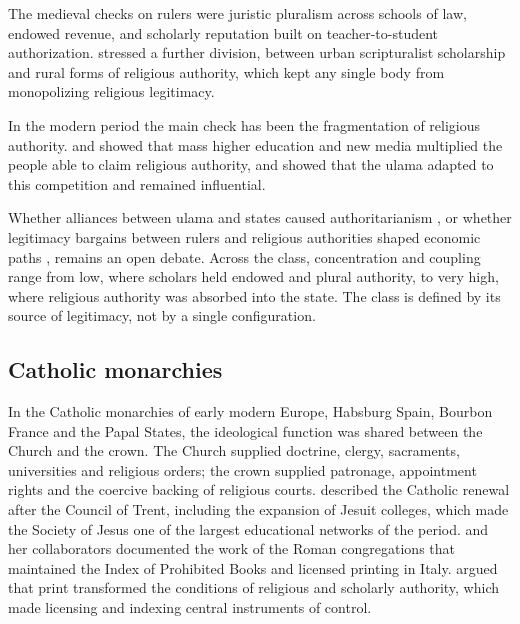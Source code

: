 \documentclass[11pt,letterpaper]{article}
\theoremstyle{definition}
\theoremstyle{remark}
\begin{document}
The medieval checks on rulers were juristic pluralism across schools of law, endowed revenue, and scholarly reputation built on teacher-to-student authorization. \citet{gellner1981} stressed a further division, between urban scripturalist scholarship and rural forms of religious authority, which kept any single body from monopolizing religious legitimacy.

In the modern period the main check has been the fragmentation of religious authority. \citet{eickelman1992} and \citet{eickelman1996} showed that mass higher education and new media multiplied the people able to claim religious authority, and \citet{zaman2002} showed that the ulama adapted to this competition and remained influential.

Whether alliances between ulama and states caused authoritarianism \citep{kuru2019}, or whether legitimacy bargains between rulers and religious authorities shaped economic paths \citep{rubin2017}, remains an open debate. Across the class, concentration and coupling range from low, where scholars held endowed and plural authority, to very high, where religious authority was absorbed into the state. The class is defined by its source of legitimacy, not by a single configuration.

\subsection{Catholic monarchies}

In the Catholic monarchies of early modern Europe, Habsburg Spain, Bourbon France and the Papal States, the ideological function was shared between the Church and the crown. The Church supplied doctrine, clergy, sacraments, universities and religious orders; the crown supplied patronage, appointment rights and the coercive backing of religious courts. \citet{hsia1998} described the Catholic renewal after the Council of Trent, including the expansion of Jesuit colleges, which made the Society of Jesus one of the largest educational networks of the period. \citet{fragnito2001} and her collaborators documented the work of the Roman congregations that maintained the Index of Prohibited Books and licensed printing in Italy. \citet{eisenstein1979} argued that print transformed the conditions of religious and scholarly authority, which made licensing and indexing central instruments of control.
\end{document}
